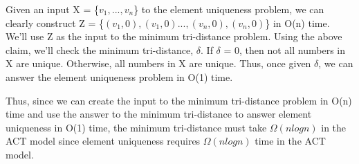 \documentclass[11pt,a4paper]{article}
\begin{document}
Given an input X = \{$v_{1},...,v_{n}$\} to the element uniqueness problem, we can clearly construct Z =  \{$(v_{1}, 0), (v_{1}, 0)...,(v_{n}, 0), (v_{n}, 0)$\} in O(n) time. We'll use Z as the input to the minimum tri-distance problem. Using the above claim, we'll check the minimum tri-distance, $\delta$. If $\delta$ = 0, then not all numbers in X are unique. Otherwise, all numbers in X are unique. Thus, once given $\delta$, we can answer the element uniqueness problem in O(1) time. 

Thus, since we can create the input to the minimum tri-distance problem in O(n) time and use the answer to the minimum tri-distance to answer element uniqueness in O(1) time, the minimum tri-distance must take $\Omega(nlogn)$ in the ACT model since element uniqueness requires $\Omega(nlogn)$ time in the ACT model. 
 
\end{document}
